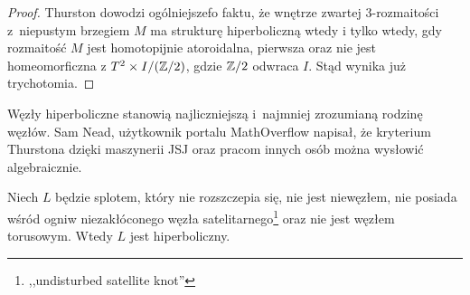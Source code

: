 \begin{proof}
    Thurston \cite[s. 360]{thurston82} dowodzi ogólniejszefo faktu, że wnętrze zwartej 3-rozmaitości z~niepustym brzegiem $M$ ma strukturę hiperboliczną wtedy i tylko wtedy, gdy rozmaitość $M$ jest homotopijnie atoroidalna, pierwsza oraz nie jest homeomorficzna z $T^2 \times I / (\mathbb Z/2)$, gdzie $\mathbb Z/2$ odwraca $I$.
    Stąd wynika już trychotomia.
\end{proof}


Węzły hiperboliczne stanowią najliczniejszą i~najmniej zrozumianą rodzinę węzłów.
Sam Nead, użytkownik portalu MathOverflow napisał, że kryterium Thurstona dzięki maszynerii JSJ oraz pracom innych osób można wysłowić algebraicznie.
%

\begin{proposition}
    Niech $L$ będzie splotem, który nie rozszczepia się, nie jest niewęzłem, nie posiada wśród ogniw niezakłóconego węzła satelitarnego\footnote{,,undisturbed satellite knot''} oraz nie jest węzłem torusowym.
%
    Wtedy $L$ jest hiperboliczny.
\end{proposition}

